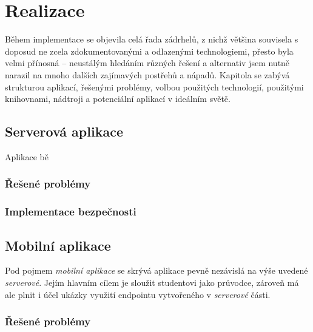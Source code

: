 
\chapter{Realizace}
Během implementace se objevila celá řada zádrhelů, z nichž většina souvisela s doposud ne zcela zdokumentovanými a odlazenými technologiemi, přesto byla velmi přínosná -- neustálým hledáním různých řešení a alternativ jsem nutně narazil na mnoho dalších zajímavých postřehů a nápadů. Kapitola se zabývá strukturou aplikací, řešenými problémy, volbou použitých technologií, použitými knihovnami, nádtroji a potenciální aplikací v ideálním světě.

\section{Serverová aplikace}
Aplikace bě

\subsection{Řešené problémy}



\subsection{Implementace bezpečnosti}


\section{Mobilní aplikace}
Pod pojmem \textit{mobilní aplikace} se skrývá aplikace pevně nezávislá na výše uvedené \textit{serverové}. Jejím hlavním cílem je sloužit studentovi   jako průvodce, zároveň má ale plnit i účel ukázky využití  endpointu vytvořeného v \textit{serverové} části.


\subsection{Řešené problémy}

